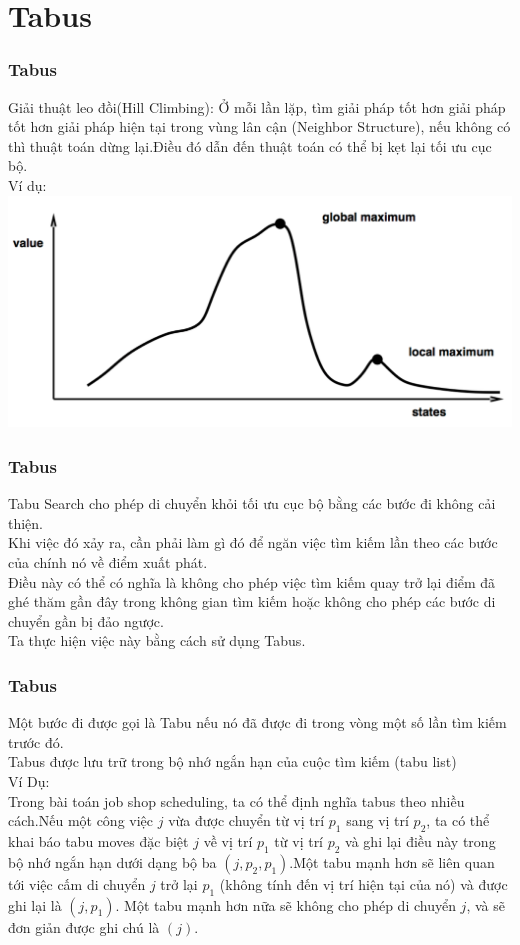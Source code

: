 \documentclass[12pt]{beamer}
\begin{document}
	\section{Tabus}
	\begin{frame}
		\frametitle{Tabus}
		Giải thuật leo đồi(Hill Climbing): Ở mỗi lần lặp, tìm giải pháp tốt hơn giải pháp tốt hơn giải pháp hiện tại trong vùng lân cận (Neighbor Structure), nếu không có thì thuật toán dừng lại.Điều đó dẫn đến thuật toán có thể bị kẹt lại tối ưu cục bộ.\\
		Ví dụ:\\
		\includegraphics[scale=0.4]{HillClimbing.png}\\
	\end{frame}

	\begin{frame}
		\frametitle{Tabus}
		Tabu Search cho phép di chuyển khỏi tối ưu cục bộ bằng các bước đi không cải thiện.\\
		Khi việc đó xảy ra, cần phải làm gì đó để ngăn việc tìm kiếm lần theo các bước của chính nó về điểm xuất phát.\\
		Điều này có thể có nghĩa là không cho phép việc tìm kiếm quay trở lại điểm đã ghé thăm gần đây trong không gian tìm kiếm hoặc không cho phép các bước di chuyển gần bị đảo ngược.\\
		Ta thực hiện việc này bằng cách sử dụng Tabus.
	\end{frame}

	\begin{frame}
		\frametitle{Tabus}
		Một bước đi được gọi là Tabu nếu nó đã được đi trong vòng một số lần tìm kiếm trước đó.\\
		Tabus được lưu trữ trong bộ nhớ ngắn hạn của cuộc tìm kiếm (tabu list)\\
		Ví Dụ:\\
		Trong bài toán job shop scheduling, ta có thể định nghĩa tabus theo nhiều cách.Nếu một công việc $j$ vừa được chuyển từ vị trí $p_1$ sang vị trí $p_2$, ta có thể khai báo tabu moves đặc biệt $j$ về vị trí $p_1$ từ vị trí $p_2$ và ghi lại điều này trong bộ nhớ ngắn hạn dưới dạng bộ ba $(j, p_2, p_1)$.Một tabu mạnh hơn sẽ liên quan tới việc cấm di chuyển $j$ trở lại $p_1$ (không tính đến vị trí hiện tại của nó) và được ghi lại là $(j, p_1)$. Một tabu mạnh hơn nữa sẽ không cho phép di chuyển $j$, và sẽ đơn giản được ghi chú là $(j)$.
	\end{frame}
	
\end{document}
